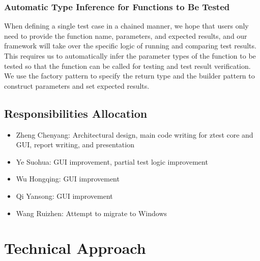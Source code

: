 \documentclass{article}
\begin{document}
\subsubsection{Automatic Type Inference for Functions to Be Tested}
When defining a single test case in a chained manner, we hope that users only need to provide the function name, parameters, and expected results, and our framework will take over the specific logic of running and comparing test results. This requires us to automatically infer the parameter types of the function to be tested so that the function can be called for testing and test result verification. We use the factory pattern to specify the return type and the builder pattern to construct parameters and set expected results.
\subsection{Responsibilities Allocation}
\begin{itemize}[leftmargin=*]
    \item Zheng Chenyang: Architectural design, main code writing for ztest core and GUI, report writing, and presentation
    \item Ye Suohua: GUI improvement, partial test logic improvement
    \item Wu Hongqing: GUI improvement
    \item Qi Yansong: GUI improvement
    \item Wang Ruizhen: Attempt to migrate to Windows
\end{itemize}

\section{Technical Approach}
\end{document}
